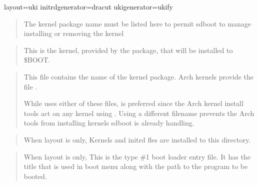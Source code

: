 \documentclass[letterpaper,11pt,english]{sphinxmanual}
\begin{document}
\begin{sphinxVerbatim}[commandchars=\\\{\}]
layout=uki
initrd\PYGZus{}generator=dracut
uki\PYGZus{}generator=ukify
\end{sphinxVerbatim}

\sphinxAtStartPar
{}
\begin{quote}

\sphinxAtStartPar
The kernel package name must be listed here to permit sd\sphinxhyphen{}boot to manage installing
or removing the kernel
\end{quote}

\sphinxAtStartPar
{}
\begin{quote}

\sphinxAtStartPar
This is the kernel, provided by the package, that will be installed to \$BOOT.
\end{quote}

\sphinxAtStartPar
{}
\begin{quote}

\sphinxAtStartPar
This file contains the name of the kernel package.
Arch kernels provide the file .

\sphinxAtStartPar
While  uses either of these files,  is preferred
since the Arch kernel install tools act on any kernel using .
Using a different filename prevents the Arch tools from installing kernels
sd\sphinxhyphen{}boot is already handling.
\end{quote}

\sphinxAtStartPar
{}
\begin{quote}

\sphinxAtStartPar
When layout is  only,
Kernels and initrd fles are installed to this directory.
\end{quote}

\sphinxAtStartPar
{}
\begin{quote}

\sphinxAtStartPar
When layout is  only,
This is the type \#1 boot loader entry file. It has the title that is used in boot menu
along with the path to the program to be booted.
\end{quote}
\end{document}
